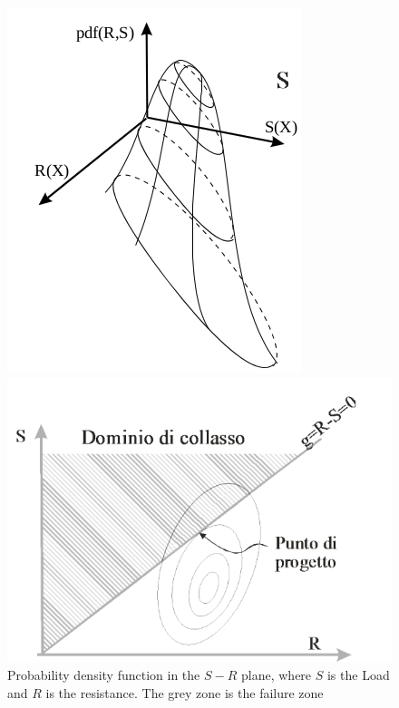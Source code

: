 \begin{figure}[t]
\centering
\begin{minipage}{.5\textwidth}
 \flushleft
  \includegraphics[scale=0.4]{./SurfWaves_figs/pdf_in_SR_plane.png}
\end{minipage}%
\begin{minipage}{.5\textwidth}
 \flushleft
  \includegraphics[scale=0.4]{./SurfWaves_figs/collapse_zone_in_SR_plane.png}
\end{minipage}
\caption{Probability density function in the $S-R$ plane, where $S$ is the Load and $R$ is the resistance. The grey zone is the failure zone}
  \label{fig:test3}
\end{figure}
